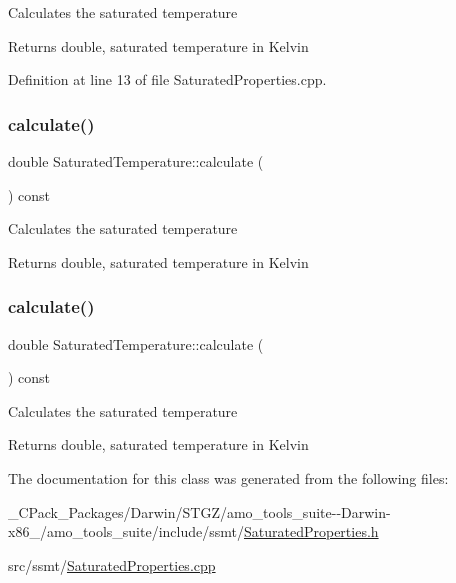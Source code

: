 Calculates the saturated temperature \begin{DoxyReturn}{Returns}
double, saturated temperature in Kelvin 
\end{DoxyReturn}


Definition at line 13 of file Saturated\+Properties.\+cpp.

\mbox{\label{class_saturated_temperature_a4aa0d2a337289dd36f4e063f1f67aaa5}} 
\subsubsection{\texorpdfstring{calculate()}{calculate()}\hspace{0.1cm}{\footnotesize\ttfamily [2/3]}}
{\footnotesize\ttfamily double Saturated\+Temperature\+::calculate (\begin{DoxyParamCaption}{ }\end{DoxyParamCaption}) const}

Calculates the saturated temperature \begin{DoxyReturn}{Returns}
double, saturated temperature in Kelvin 
\end{DoxyReturn}
\mbox{\label{class_saturated_temperature_a4aa0d2a337289dd36f4e063f1f67aaa5}} 
\subsubsection{\texorpdfstring{calculate()}{calculate()}\hspace{0.1cm}{\footnotesize\ttfamily [3/3]}}
{\footnotesize\ttfamily double Saturated\+Temperature\+::calculate (\begin{DoxyParamCaption}{ }\end{DoxyParamCaption}) const}

Calculates the saturated temperature \begin{DoxyReturn}{Returns}
double, saturated temperature in Kelvin 
\end{DoxyReturn}


The documentation for this class was generated from the following files\+:\begin{DoxyCompactItemize}
\item 
\+\_\+\+C\+Pack\+\_\+\+Packages/\+Darwin/\+S\+T\+G\+Z/amo\+\_\+tools\+\_\+suite-\/-\/\+Darwin-\/x86\+\_/amo\+\_\+tools\+\_\+suite/include/ssmt/\hyperlink{___c_pack___packages_2_darwin_2_s_t_g_z_2amo__tools__suite--_darwin-x86__64_2amo__tools__suite_2b97ccf799ea6561aa4d6a618c8073459}{Saturated\+Properties.\+h}\item 
src/ssmt/\hyperlink{_saturated_properties_8cpp}{Saturated\+Properties.\+cpp}\end{DoxyCompactItemize}

